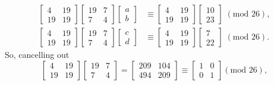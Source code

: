 \documentclass{article}
\begin{document}
\begin{align*}
    \begin{bmatrix}
        4 & 19 \\
        19 & 19
    \end{bmatrix} \begin{bmatrix}
        19 & 7 \\
        7 & 4
    \end{bmatrix} \begin{bmatrix}
        a \\
        b
    \end{bmatrix} &\equiv \begin{bmatrix}
        4 & 19 \\
        19 & 19
    \end{bmatrix} \begin{bmatrix}
        10 \\
        23
    \end{bmatrix} \; (\text{mod } 26), \\
    \begin{bmatrix}
        4 & 19 \\
        19 & 19
    \end{bmatrix} \begin{bmatrix}
        19 & 7 \\
        7 & 4
    \end{bmatrix} \begin{bmatrix}
        c \\
        d
    \end{bmatrix} &\equiv \begin{bmatrix}
        4 & 19 \\
        19 & 19
    \end{bmatrix} \begin{bmatrix}
        7 \\
        22
    \end{bmatrix} \; (\text{mod } 26).
\end{align*}
So, cancelling out
\[
\begin{bmatrix}
        4 & 19 \\
        19 & 19
    \end{bmatrix} \begin{bmatrix}
        19 & 7 \\
        7 & 4
    \end{bmatrix} = \begin{bmatrix}
        209 & 104 \\
        494 & 209
    \end{bmatrix} \equiv \begin{bmatrix}
        1 & 0 \\
        0 & 1
    \end{bmatrix} (\text{mod } 26),
\]
\end{document}
